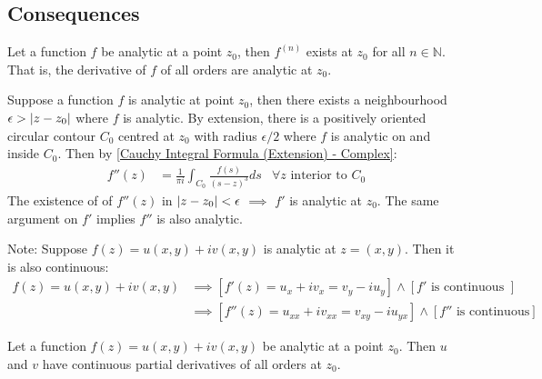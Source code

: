 \documentclass[12pt, english]{book}
\makeatletter
\renewenvironment{proof}[1][\proofname]{\par
	\pushQED{\qed}%
	\normalfont \topsep6\p@\@plus6\p@\relax
	\list{}{%
		\settowidth{\leftmargin}{\itshape\proofname:\hskip\labelsep}%
		\setlength{\labelwidth}{0pt}%
		\setlength{\itemindent}{-\leftmargin}%
	}%
	\item[\hskip\labelsep\itshape#1\@addpunct{:}]\ignorespaces
	}{ \popQED\endlist\@endpefalse}
\makeatother
\begin{document}
	\subsection{Consequences} \label{Cauchy Integral Theorem Consequences Subsection - Complex}
	
	\begin{theorem}
		 
		\label{Analytic implies existance of high order derivatives theorem - Complex}
		Let a function \(f\) be analytic at a point \(z_0\), then \(f^{(n)}\) exists at \(z_0\) for all \(n \in \mathbb{N}\). That is, the derivative of \(f\) of all orders are analytic at \(z_0\).
	\end{theorem}
	\begin{proof}
		Suppose a function \(f\) is analytic at point \(z_0\), then there exists a neighbourhood \(\epsilon > \abs{z - z_0}\) where \(f\) is analytic. By extension, there is a positively oriented circular contour \(C_0\) centred at \(z_0\) with radius \(\epsilon / 2\) where \(f\) is analytic on and inside \(C_0\).
		Then by \cref{Cauchy Integral Formula (Extension) - Complex}:
		\begin{align*}
			f''(z) &= \frac{1}{\pi i} \int_{C_0} \frac{f(s)}{(s-z)^3} ds & \forall z \text{ interior to } C_0
		\end{align*}
		The existence of of \(f''(z)\) in \(\abs{z-z_0}<\epsilon\) \(\implies\) \(f'\) is analytic at \(z_0\). The same argument on \(f'\) implies \(f''\) is also analytic.
	\end{proof}
	
	Note: Suppose \(f(z) = u(x,y) + iv(x,y)\) is analytic at \(z = (x,y)\). Then it is also continuous: 
	\begin{align*}
		f(z) = u(x,y) + iv(x,y) 
		&\implies [f'(z) = u_x + iv_x = v_y - iu_y] \land [f' \text{ is continuous }] \\
		&\implies [f''(z) = u_{xx} + iv_{xx} = v_{xy} - iu_{yx}] \land [f'' \text{ is continuous}]
 	\end{align*}
	
	\begin{corollary}
		Let a function \(f(z) = u(x,y) + iv(x,y)\) be analytic at a point \(z_0\). Then \(u\) and \(v\) have continuous partial derivatives of all orders at \(z_0\). 
	\end{corollary}
\end{document}
